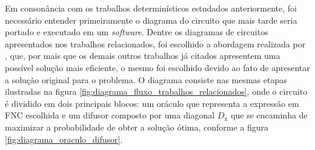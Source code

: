\documentclass[12pt]{article}
\begin{document}
Em consonância com os trabalhos determinísticos estudados anteriormente, foi necessário entender primeiramente o diagrama do circuito que mais tarde seria portado e executado em um \textit{software}. Dentre os diagramas de circuitos apresentados nos trabalhos relacionados, foi escolhido a abordagem realizada por \cite{fernandes:19}, que, por mais que os demais outros trabalhos já citados apresentem uma possível solução mais eficiente, o mesmo foi escolhido devido ao fato de apresentar a solução original para o problema. O diagrama consiste nas mesmas etapas ilustradas na figura \ref{fig:diagrama_fluxo_trabalhos_relacionados}, onde o circuito é dividido em dois principais blocos: um oráculo que representa a expressão em FNC escolhida e um difusor composto por uma diagonal $\mathrm{\textit{D}_x}$ que se encaminha de maximizar a probabilidade de obter a solução ótima, conforme a figura \ref{fig:diagrama_oraculo_difusor}.
\end{document}
